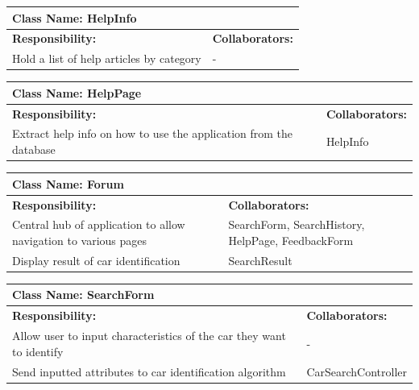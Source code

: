 \documentclass[12pt]{article}
\begin{document}
	\begin{table}[ht]
		\centering
		\begin{tabular}{|p{5cm}|p{5cm}|}
			\hline
			\multicolumn{2}{|l|}{\textbf{Class Name:} HelpInfo} \\
			\hline
			\textbf{Responsibility:} & \textbf{Collaborators:} \\
			\hline
			Hold a list of help articles by category & - \\
			\hline
		\end{tabular}
	\end{table}

	\begin{table}[ht]
		\centering
		\begin{tabular}{|p{5cm}|p{5cm}|}
			\hline
			\multicolumn{2}{|l|}{\textbf{Class Name:} HelpPage} \\
			\hline
			\textbf{Responsibility:} & \textbf{Collaborators:} \\
			\hline
			Extract help info on how to use the application from the database & HelpInfo\\
			\hline
		\end{tabular}
	\end{table}

	\begin{table}[ht]
		\centering
		\begin{tabular}{|p{5cm}|p{5cm}|}
			\hline
			\multicolumn{2}{|l|}{\textbf{Class Name:} Forum} \\
			\hline
			\textbf{Responsibility:} & \textbf{Collaborators:} \\
			\hline
			Central hub of application to allow navigation to various pages & SearchForm, SearchHistory, HelpPage, FeedbackForm\\
			\hline
			Display result of car identification & SearchResult\\
			\hline
		\end{tabular}
	\end{table}

	\begin{table}[ht]
		\centering
		\begin{tabular}{|p{5cm}|p{5cm}|}
			\hline
			\multicolumn{2}{|l|}{\textbf{Class Name:} SearchForm} \\
			\hline
			\textbf{Responsibility:} & \textbf{Collaborators:} \\
			\hline
			Allow user to input characteristics of the car they want to identify & -\\
			\hline
			Send inputted attributes to car identification algorithm & CarSearchController\\
			\hline
		\end{tabular}
	\end{table}
\end{document}
